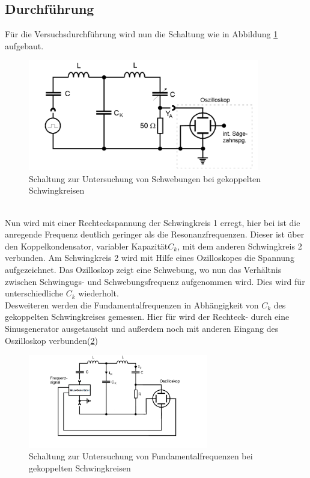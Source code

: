 \subsection{Durchführung}
\label{subsec:Durchführung}
Für die Versuchsdurchführung wird nun die Schaltung
wie in Abbildung \ref{abb:schwebungsaufbau} aufgebaut.
\begin{figure}[h]
   \centering
   \includegraphics[width=0.9\textwidth]{Aufbau_a).PNG}
   \caption{Schaltung zur Untersuchung von Schwebungen bei gekoppelten Schwingkreisen \cite{skript}}
   \label{abb:schwebungsaufbau}
\end{figure}\\
Nun wird mit einer Rechteckspannung der
Schwingkreis 1 erregt, hier bei ist die anregende Frequenz
deutlich geringer als die Resonanzfrequenzen.
Dieser ist über den Koppelkondensator,
variabler Kapazität$C_k$, mit dem anderen Schwingkreis 2
verbunden. Am Schwingkreis 2 wird mit
Hilfe eines Ozilloskopes die Spannung aufgezeichnet.
Das Ozilloskop zeigt eine Schwebung, wo nun das Verhältnis
zwischen Schwingugs- und Schwebungsfrequenz aufgenommen wird.
Dies wird für unterschiedliche $C_k$ wiederholt.
\\
Desweiteren werden die Fundamentalfrequenzen
in Abhängigkeit von $C_k$
des gekoppelten Schwingkreises gemessen.
Hier für wird der Rechteck- durch
eine Sinusgenerator ausgetauscht und außerdem
noch mit anderen Eingang des Oszilloskop verbunden(\ref{abb:fundamentalaufbau})
\begin{figure}[h]
  \centering
  \includegraphics[width=0.7\textwidth]{physik.PNG}
  \caption{Schaltung zur Untersuchung von Fundamentalfrequenzen bei gekoppelten Schwingkreisen \cite{skript}}
  \label{abb:fundamentalaufbau}
\end{figure}\\
